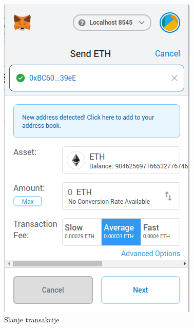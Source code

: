 \documentclass[times, utf8, zavrsni]{fer}
\begin{document}
\begin{figure}[ht]
  \centering
  \begin{minipage}[b]{0.4\textwidth}
    \includegraphics[width=\textwidth]{mmsendtocubie.png}
    \caption{Slanje transakcije}
  \end{minipage}
  \hfill
  \begin{minipage}[b]{0.4\textwidth}

\end{minipage}
\end{figure}
\end{document}
